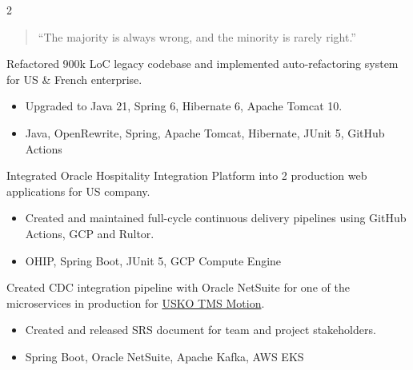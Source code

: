 \documentclass[10pt,a4paper,normalphoto]{altacv}
\begin{document}
  \begin{paracol}{2}

    \begin{quote}
      ``The majority is always wrong, and the minority is rarely right.''
    \end{quote}

    Refactored 900k LoC legacy codebase and implemented auto-refactoring system for US \& French enterprise.
    \begin{itemize}
      \item Upgraded to Java 21, Spring 6, Hibernate 6, Apache Tomcat 10.
      \item Java, OpenRewrite, Spring, Apache Tomcat, Hibernate, JUnit 5, GitHub Actions
    \end{itemize}
    Integrated Oracle Hospitality Integration Platform into 2 production
    web applications for US company.
    \begin{itemize}
      \item Created and maintained full-cycle continuous delivery pipelines using GitHub Actions, GCP and Rultor.
      \item OHIP, Spring Boot, JUnit 5, GCP Compute Engine
    \end{itemize}
    Created CDC integration pipeline with Oracle NetSuite for one of the
    microservices in production for \href{https://motiontms.com}{USKO TMS Motion}.
    \begin{itemize}
      \item Created and released SRS document for team and project stakeholders.
      \item Spring Boot, Oracle NetSuite, Apache Kafka, AWS EKS
    \end{itemize}


\end{paracol}
\end{document}
